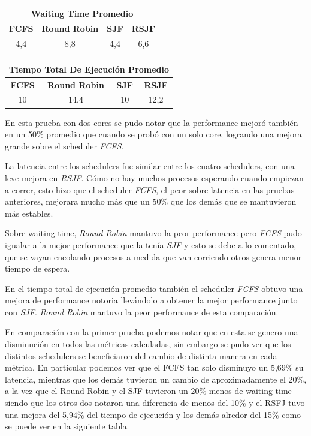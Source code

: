 \begin{center}
	\begin{tabular}{|c|c|c|c|}
		\hline
		\multicolumn{4}{|c|}{\large{\textbf{Waiting Time Promedio}}} \\
		\hline
		\textbf{FCFS} & \textbf{Round Robin} & \textbf{SJF} & \textbf{RSJF} \\
		\hline
		4,4 & 8,8 & 4,4 & 6,6 \\
		\hline
	\end{tabular}
\end{center}

\begin{center}
	\begin{tabular}{|c|c|c|c|}
		\hline
		\multicolumn{4}{|c|}{\large{\textbf{Tiempo Total De Ejecución Promedio}}} \\
		\hline
		\textbf{FCFS} & \textbf{Round Robin} & \textbf{SJF} & \textbf{RSJF} \\
		\hline
		10 & 14,4 & 10 & 12,2 \\
		\hline
	\end{tabular}
\end{center}

En esta prueba con dos cores se pudo notar que la performance mejoró también en un 50\% promedio que cuando se probó con un solo core, logrando una mejora grande sobre el scheduler \emph{FCFS}.

La latencia entre los schedulers fue similar entre los cuatro schedulers, con una leve mejora en \emph{RSJF}. Cómo no hay muchos procesos esperando cuando empiezan a correr, esto hizo que el scheduler \emph{FCFS}, el peor sobre latencia en las pruebas anteriores, mejorara mucho más que un 50\% que los demás que se mantuvieron más estables.

Sobre waiting time, \emph{Round Robin} mantuvo la peor performance pero \emph{FCFS} pudo igualar a la mejor performance que la tenía \emph{SJF} y esto se debe a lo comentado, que se vayan encolando procesos a medida que van corriendo otros genera menor tiempo de espera.

En el tiempo total de ejecución promedio también el scheduler \emph{FCFS} obtuvo una mejora de performance notoria llevándolo a obtener la mejor performance junto con \emph{SJF}. \emph{Round Robin} mantuvo la peor performance de esta comparación.

En comparación con la primer prueba podemos notar que en esta se genero una disminución en todos las métricas calculadas, sin embargo se pudo ver que los distintos schedulers se beneficiaron del cambio de distinta manera en cada métrica. En particular podemos ver que el FCFS tan solo disminuyo un 5,69\% su latencia, mientras que los demás tuvieron un cambio de aproximadamente el 20\%, a la vez que el Round Robin y el SJF tuvieron un 20\% menos de waiting time siendo que los otros dos notaron una diferencia de menos del 10\% y el RSFJ tuvo una mejora del 5,94\% del tiempo de ejecución y los demás alredor del 15\% como se puede ver en la siguiente tabla.

